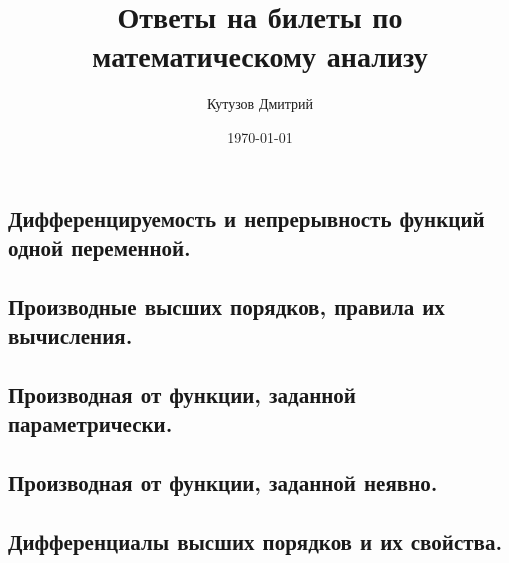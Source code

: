 \documentclass[a4paper,12pt]{article}
\author{Кутузов Дмитрий}
\title{Ответы на билеты по математическому анализу}
\date{\today}
\theoremstyle{plain} %
\theoremstyle{definition} %
\theoremstyle{remark} %
\begin{document}

\maketitle

{
  \hypersetup{linkcolor=black}
  \tableofcontents
  \newpage
}

\begin{center}
  \section*{Дифференцируемость и непрерывность функций одной переменной.}
\end{center}

\begin{center}
\subsection*{Производные высших порядков, правила их вычисления.}
\end{center}

\begin{center}
\subsection*{Производная от функции, заданной параметрически.}
\end{center}

\begin{center}
\subsection*{Производная от функции, заданной неявно.                                                   }
\end{center}

\begin{center}
\subsection*{Дифференциалы высших порядков и их свойства.                                               }
\end{center}
\end{document}
